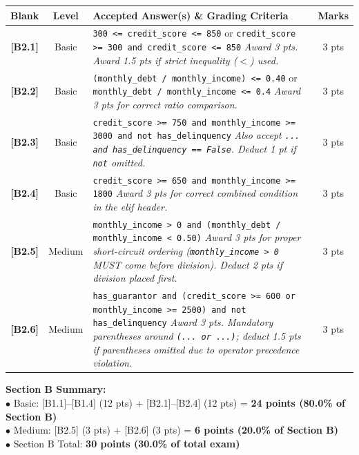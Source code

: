 \documentclass[11pt,a4paper]{article}
\begin{document}
\begin{center}
\renewcommand{\arraystretch}{1.2}
\setlength{\tabcolsep}{3.5pt}
\begin{tabularx}{\textwidth}{|c|c|X|c|}
\hline
\textbf{Blank} & \textbf{Level} & \textbf{Accepted Answer(s) \& Grading Criteria} & \textbf{Marks} \\
\hline
\textbf{[B2.1]} & Basic & \texttt{300 <= credit\_score <= 850} or \texttt{credit\_score >= 300 and credit\_score <= 850}\newline
\textit{Award 3 pts. Award 1.5 pts if strict inequality ($<$) used.} & 3 pts \\
\hline
\textbf{[B2.2]} & Basic & \texttt{(monthly\_debt / monthly\_income) <= 0.40} or \texttt{monthly\_debt / monthly\_income <= 0.4}\newline
\textit{Award 3 pts for correct ratio comparison.} & 3 pts \\
\hline
\textbf{[B2.3]} & Basic & \texttt{credit\_score >= 750 and monthly\_income >= 3000 and not has\_delinquency}\newline
\textit{Also accept \texttt{... and has\_delinquency == False}. Deduct 1 pt if \texttt{not} omitted.} & 3 pts \\
\hline
\textbf{[B2.4]} & Basic & \texttt{credit\_score >= 650 and monthly\_income >= 1800}\newline
\textit{Award 3 pts for correct combined condition in the elif header.} & 3 pts \\
\hline
\textbf{[B2.5]} & Medium & \texttt{monthly\_income > 0 and (monthly\_debt / monthly\_income < 0.50)}\newline
\textit{Award 3 pts for proper short-circuit ordering (\texttt{monthly\_income > 0} MUST come before division). Deduct 2 pts if division placed first.} & 3 pts \\
\hline
\textbf{[B2.6]} & Medium & \texttt{has\_guarantor and (credit\_score >= 600 or monthly\_income >= 2500) and not has\_delinquency}\newline
\textit{Award 3 pts. Mandatory parentheses around \texttt{(... or ...)}; deduct 1.5 pts if parentheses omitted due to operator precedence violation.} & 3 pts \\
\hline
\end{tabularx}
\end{center}

\vspace{1mm}
\begin{tcolorbox}[colback=boxbg, colframe=primaryblue!45, arc=1.2mm, left=2.0mm, right=2.0mm, top=1.0mm, bottom=1.0mm]
\small
\textbf{Section B Summary:}\\
$\bullet$ Basic: [B1.1]--[B1.4] (12 pts) + [B2.1]--[B2.4] (12 pts) = \textbf{24 points (80.0\% of Section B)}\\
$\bullet$ Medium: [B2.5] (3 pts) + [B2.6] (3 pts) = \textbf{6 points (20.0\% of Section B)}\\
$\bullet$ Section B Total: \textbf{30 points (30.0\% of total exam)}
\end{tcolorbox}
\end{document}
